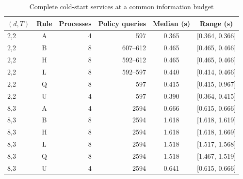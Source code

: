 \begin{table}[htbp]
\centering\caption{Complete cold-start services at a common information budget}\label{tab:cold70}
{\small\setlength{\tabcolsep}{3pt}
\begin{tabular}{lcrrcc}
\hline
$(d,T)$ & Rule & Processes & Policy queries & Median (s) & Range (s) \\
\hline
2,2 & A & 4 & 597 & 0.365 & [0.364, 0.366] \\
2,2 & B & 8 & 607--612 & 0.465 & [0.465, 0.466] \\
2,2 & H & 8 & 592--612 & 0.465 & [0.465, 0.466] \\
2,2 & L & 8 & 592--597 & 0.440 & [0.414, 0.466] \\
2,2 & Q & 8 & 597 & 0.415 & [0.415, 0.967] \\
2,2 & U & 4 & 597 & 0.390 & [0.364, 0.415] \\
8,3 & A & 4 & 2594 & 0.666 & [0.615, 0.666] \\
8,3 & B & 8 & 2594 & 1.618 & [1.618, 1.619] \\
8,3 & H & 8 & 2594 & 1.618 & [1.618, 1.669] \\
8,3 & L & 8 & 2594 & 1.518 & [1.517, 1.568] \\
8,3 & Q & 8 & 2594 & 1.518 & [1.467, 1.519] \\
8,3 & U & 4 & 2594 & 0.641 & [0.615, 0.666] \\
\hline\end{tabular}}
\par{}
\end{table}
